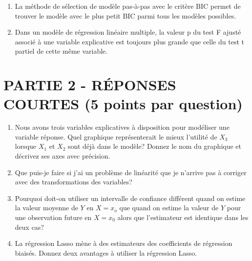 \documentclass[11pt]{article}
\begin{document}
{\begin{enumerate}
\vspace{1.6 in}

\item La méthode de sélection de modèle pas-à-pas avec le critère BIC permet de trouver le modèle avec le plus petit BIC parmi tous les modèles possibles.

\vspace{1.6 in}
%
\item  Dans un modèle de régression linéaire multiple, la valeur p du test F ajusté associé à une variable explicative est toujours plus grande que celle du test t partiel de cette même variable.

\vspace{1.2 in}


%


%
\end{enumerate}


\newpage




\vspace*{-0.7 in}
\section*{PARTIE 2 - RÉPONSES COURTES (5 points par question)}
\vspace{0.1 in}
\begin{enumerate}
\item Nous avons trois variables explicatives à disposition pour modéliser une variable réponse. Quel graphique représenterait le mieux l’utilité de $X_3$ lorsque $X_1$ et $X_2$ sont déjà dans le modèle? Donnez le nom du graphique et décrivez ses axes avec précision.
\vspace{2.1 in}
\item Que puis-je faire si j’ai un problème de linéarité que je n’arrive pas à
corriger avec des transformations des variables?
\vspace{1.8 in}
\item  Pourquoi doit-on utiliser un intervalle de confiance différent quand on estime la valeur moyenne de $Y$ en $X = x_o$ que quand on estime la valeur de $Y$ pour une observation future en $X = x_0$ alors que l’estimateur est identique dans les deux cas?
\vspace{1.8 in}
\item La régression Lasso mène à des estimateurs des coefficients de régression biaisés. Donnez deux avantages à utiliser la régression Lasso.
\end{enumerate}


}
\end{document}
